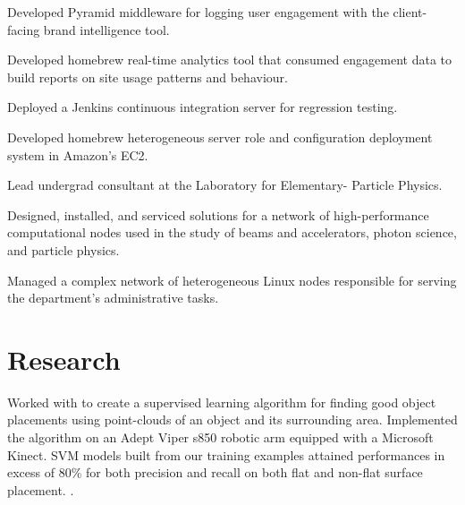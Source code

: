 \documentclass[]{deedy-resume-openfont}
\begin{document}
\begin{minipage}[t]{0.66\textwidth}
\begin{tightemize}
                Developed Pyramid middleware for logging user engagement with
                the client-facing brand intelligence tool.
            \item
                Developed homebrew real-time analytics tool that consumed
                engagement data to build reports on site usage patterns and
                behaviour.
            \item
                Deployed a Jenkins continuous integration server for
                regression testing.
            \item
                Developed homebrew heterogeneous server role and configuration
                deployment system in Amazon’s EC2.
        \end{tightemize}
    \sectionsep

        \begin{tightemize}
            \item
                Lead undergrad consultant at the Laboratory for Elementary-
                Particle Physics.
            \item
                Designed, installed, and serviced solutions for a network of
                high-performance computational nodes used in the study of beams
                and accelerators, photon science, and particle physics.
            \item
                Managed a complex network of heterogeneous Linux nodes
                responsible for serving the department’s administrative tasks.
        \end{tightemize}
    \sectionsep

    \section{Research}
                Worked with  to create a supervised learning algorithm
                for finding good object placements using point-clouds of an object
                and its surrounding area. Implemented the algorithm on an Adept
                Viper s850 robotic arm equipped with a Microsoft Kinect. SVM models
                built from our training examples attained performances in excess of
                80\% for both precision and recall on both flat and non-flat
                surface placement.
                .
        \sectionsep


\end{minipage}
\end{document}
